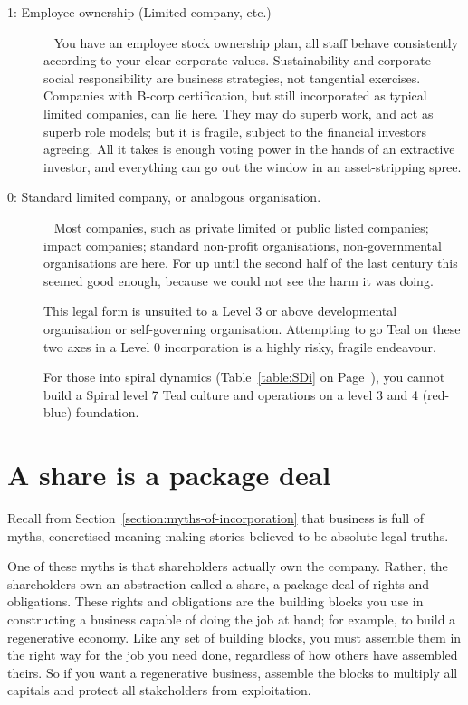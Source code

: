\begin{description}
\item[1: Employee ownership (Limited company, etc.)] ~\newline
You have an employee stock ownership plan, all staff behave consistently according to your clear corporate values. Sustainability and corporate social responsibility are business strategies, not tangential exercises. Companies with B-corp certification, but still incorporated as typical limited companies, can lie here. They may do superb work, and act as superb role models; but it is fragile, subject to the financial investors agreeing. All it takes is enough voting power in the hands of an extractive investor, and everything can go out the window in an asset-stripping spree.


\item[0: Standard limited company, or analogous organisation. ] ~\newline
Most companies, such as private limited or public listed companies; impact companies; standard non-profit organisations, non-governmental organisations are here. For up until the second half of the last century this seemed good enough, because we could not see the harm it was doing.


This legal form is unsuited to a Level 3 or above developmental organisation or self-governing organisation. Attempting to go Teal on these two axes in a Level 0 incorporation is a highly risky, fragile endeavour. 


For those into spiral dynamics (Table~\ref{table:SDi} on Page~\pageref{table:SDi}),  you cannot build a Spiral level 7 Teal culture and operations on a level 3 and 4 (red-blue) foundation. 
\end{description}


\section{A share is a package deal}
Recall from Section~\ref{section:myths-of-incorporation} that business is full of myths,  concretised meaning\hyp{}making stories believed to be absolute legal truths. 


One of these myths is that shareholders actually own the company. Rather, the shareholders own an abstraction called a share, a package deal of rights and obligations\cite{brown-bbaequity}. These rights and obligations are the building blocks you use in constructing a business capable of doing the job at hand; for example, to build a regenerative economy. Like any set of building blocks, you must assemble them in the right way for the job you need done, regardless of how others have assembled theirs. So if you want a regenerative business, assemble the blocks to multiply all capitals and protect all stakeholders from exploitation.


